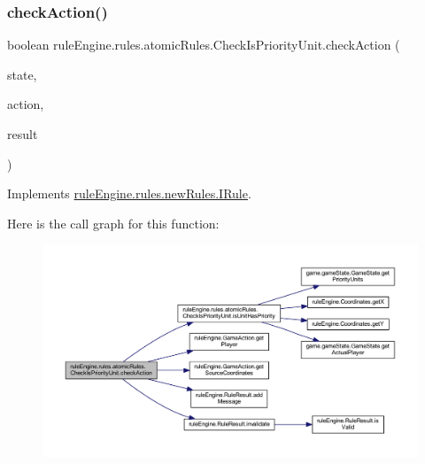 \subsubsection{\texorpdfstring{check\+Action()}{checkAction()}}
{\footnotesize\ttfamily boolean rule\+Engine.\+rules.\+atomic\+Rules.\+Check\+Is\+Priority\+Unit.\+check\+Action (\begin{DoxyParamCaption}\item[{\mbox{\hyperlink{classgame_1_1game_state_1_1_game_state}{Game\+State}}}]{state,  }\item[{\mbox{\hyperlink{classrule_engine_1_1_game_action}{Game\+Action}}}]{action,  }\item[{\mbox{\hyperlink{classrule_engine_1_1_rule_result}{Rule\+Result}}}]{result }\end{DoxyParamCaption})\hspace{0.3cm}{\ttfamily [inline]}}



Implements \mbox{\hyperlink{interfacerule_engine_1_1rules_1_1new_rules_1_1_i_rule_a72ce29a47d7a5fba75a09444a50a481e}{rule\+Engine.\+rules.\+new\+Rules.\+I\+Rule}}.

Here is the call graph for this function\+:
\nopagebreak
\begin{figure}[H]
\begin{center}
\leavevmode
\includegraphics[width=350pt]{classrule_engine_1_1rules_1_1atomic_rules_1_1_check_is_priority_unit_aab6e78a775704e1e740c3f52e664d04c_cgraph}
\end{center}
\end{figure}
\mbox{\label{classrule_engine_1_1rules_1_1atomic_rules_1_1_check_is_priority_unit_ab4053d812e96d43c5c89e6919e6796e2}} 
